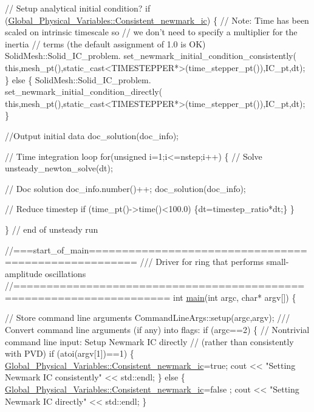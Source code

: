 \begin{DoxyCodeInclude}
{{{{ \textcolor{comment}{// Setup analytical initial condition?}
 \textcolor{keywordflow}{if} (\hyperlink{namespaceGlobal__Physical__Variables_affe3ddb0b7c1d7dbf3955738edbda1af}{Global\_Physical\_Variables::Consistent\_newmark\_ic})
  \{
   \textcolor{comment}{// Note: Time has been scaled on intrinsic timescale so}
   \textcolor{comment}{// we don't need to specify a multiplier for the inertia}
   \textcolor{comment}{// terms (the default assignment of 1.0 is OK)}
   SolidMesh::Solid\_IC\_problem.
    set\_newmark\_initial\_condition\_consistently(
     \textcolor{keyword}{this},mesh\_pt(),static\_cast<TIMESTEPPER*>(time\_stepper\_pt()),IC\_pt,dt);
  \}
 \textcolor{keywordflow}{else}
  \{
   SolidMesh::Solid\_IC\_problem.
    set\_newmark\_initial\_condition\_directly(
     \textcolor{keyword}{this},mesh\_pt(),static\_cast<TIMESTEPPER*>(time\_stepper\_pt()),IC\_pt,dt);
  \}

 \textcolor{comment}{//Output initial data}
 doc\_solution(doc\_info);

 \textcolor{comment}{// Time integration loop}
 \textcolor{keywordflow}{for}(\textcolor{keywordtype}{unsigned} i=1;i<=nstep;i++)
  \{
   \textcolor{comment}{// Solve}
   unsteady\_newton\_solve(dt); 
   
   \textcolor{comment}{// Doc solution}
   doc\_info.number()++;
   doc\_solution(doc\_info);
   
   \textcolor{comment}{// Reduce timestep}
   \textcolor{keywordflow}{if} (time\_pt()->time()<100.0) \{dt=timestep\_ratio*dt;\}
  \}

\} \textcolor{comment}{// end of unsteady run}



\textcolor{comment}{//===start\_of\_main=====================================================}\textcolor{comment}{}
\textcolor{comment}{/// Driver for ring that performs small-amplitude oscillations}
\textcolor{comment}{}\textcolor{comment}{//=====================================================================}
\textcolor{keywordtype}{int} \hyperlink{lin__unsteady__ring_8cc_a0ddf1224851353fc92bfbff6f499fa97}{main}(\textcolor{keywordtype}{int} argc, \textcolor{keywordtype}{char}* argv[])
\{

 \textcolor{comment}{// Store command line arguments}
 CommandLineArgs::setup(argc,argv);
\textcolor{comment}{}
\textcolor{comment}{ /// Convert command line arguments (if any) into flags:}
\textcolor{comment}{} \textcolor{keywordflow}{if} (argc==2)
  \{
   \textcolor{comment}{// Nontrivial command line input: Setup Newmark IC directly}
   \textcolor{comment}{// (rather than consistently with PVD)}
   \textcolor{keywordflow}{if} (atoi(argv[1])==1) 
    \{
     \hyperlink{namespaceGlobal__Physical__Variables_affe3ddb0b7c1d7dbf3955738edbda1af}{Global\_Physical\_Variables::Consistent\_newmark\_ic}=\textcolor{keyword}{true};
     cout << \textcolor{stringliteral}{"Setting Newmark IC consistently"} << std::endl;
    \}
   \textcolor{keywordflow}{else}
    \{
     \hyperlink{namespaceGlobal__Physical__Variables_affe3ddb0b7c1d7dbf3955738edbda1af}{Global\_Physical\_Variables::Consistent\_newmark\_ic}=\textcolor{keyword}{false}
      ;
     cout << \textcolor{stringliteral}{"Setting Newmark IC directly"} << std::endl;
    \}
   
}}}}
\end{DoxyCodeInclude}
